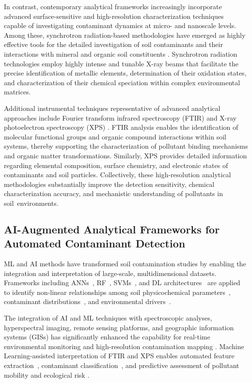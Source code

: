 \documentclass[environremediat,article,accept,pdftex,oneauthor]{Definitions/mdpi}
\begin{document}
In contrast, contemporary analytical frameworks increasingly incorporate
advanced surface-sensitive and high-resolution characterization techniques
capable of investigating contaminant dynamics at micro- and nanoscale levels.
Among these, synchrotron radiation-based methodologies have emerged as highly
effective tools for the detailed investigation of soil contaminants and their
interactions with mineral and organic soil constituents
\cite{Hu2020,Rosskopfova2012,LindhLemenkova2023a}. Synchrotron radiation
technologies employ highly intense and tunable X-ray beams that facilitate
the precise identification of metallic elements, determination of their
oxidation states, and characterization of their chemical speciation within
complex environmental matrices.

Additional instrumental techniques representative of advanced analytical
approaches include Fourier transform infrared spectroscopy (FTIR)
\cite{Xu2026} and X-ray photoelectron spectroscopy (XPS)
\cite{Guo2025,LindhLemenkova2023c}. FTIR analysis enables the identification
of molecular functional groups and organic compound interactions within soil
systems, thereby supporting the characterization of pollutant binding
mechanisms and organic matter transformations. Similarly, XPS provides
detailed information regarding elemental composition, surface chemistry, and
electronic states of contaminants and soil particles. Collectively, these
high-resolution analytical methodologies substantially improve the detection
sensitivity, chemical characterization accuracy, and mechanistic understanding
of pollutants in \mbox{soil environments.}

\subsection{AI-Augmented Analytical Frameworks for Automated Contaminant
    Detection}\label{sec3.2}

{ML and AI methods have transformed soil contamination studies by enabling the integration and interpretation of large-scale, multidimensional datasets. Frameworks including ANNs~\cite{Anifowose2024}, RF~\cite{Shaheen2018,Foronda2023}, SVMs~\cite{Gholizadeh2020}, and DL architectures~\cite{Hu2024} are applied to identify non-linear relationships among soil physicochemical parameters~\cite{Aljanabi2025}, contaminant distributions~\cite{Shaheen2018}, and environmental drivers~\cite{Gholizadeh2020}.}

The integration of AI and ML techniques with spectroscopic analyses,
hyperspectral imaging, remote sensing platforms, and geographic information
systems (GISs) has significantly enhanced the capability for real-time
environmental monitoring and high-resolution contamination mapping
\cite{Hu2024}. Machine Learning-assisted
interpretation of FTIR and XPS enables automated feature extraction~\cite{Canero,Yacomelo}, %
contaminant classification~\cite{Agyeman2022,Hu2024}, and predictive assessment of
pollutant mobility and ecological risk
\cite{Shaheen2018,Anifowose2024,Foronda2023}.
\end{document}

